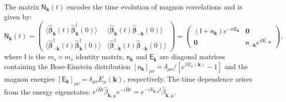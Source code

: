 The matrix $\mathsf{N}_{\mathbf{k}}(t)$ encodes the time evolution of magnon correlations and is given by:
\begin{equation}
    \mathsf{N}_{\mathbf{k}}(t) 
    = 
    \begin{pmatrix}
        \langle \hat{\boldsymbol{\beta}}_{\mathbf{k}}(t) \hat{\boldsymbol{\beta}}_{\mathbf{k}}^{\dagger}(0) \rangle & \langle \hat{\boldsymbol{\beta}}_{\mathbf{k}}(t) \hat{\boldsymbol{\beta}}_{-\mathbf{k}}(0) \rangle \\
        \langle \hat{\boldsymbol{\beta}}_{-\mathbf{k}}^{\dagger}(t) \hat{\boldsymbol{\beta}}_{\mathbf{k}}^{\dagger}(0) \rangle & \langle \hat{\boldsymbol{\beta}}_{-\mathbf{k}}^{\dagger}(t) \hat{\boldsymbol{\beta}}_{-\mathbf{k}}(0) \rangle
    \end{pmatrix}
    = 
    \begin{pmatrix}
        (\mathsf{I} + \mathsf{n}_{\mathbf{k}})e^{-it\mathsf{E}_{\mathbf{k}}} & \mathbf{0} \\
        \mathbf{0} & \mathsf{n}_{-\mathbf{k}}e^{it\mathsf{E}_{-\mathbf{k}}}
    \end{pmatrix},
\end{equation}
where $\mathsf{I}$ is the $m_s \times m_s$ identity matrix, $\mathsf{n}_{\mathbf{k}}$ and $\mathsf{E}_{\mathbf{k}}$ are diagonal matrices containing the Bose-Einstein distribution $[\mathsf{n}_{\mathbf{k}}]_{\mu\nu} = \delta_{\mu\nu}/[e^{\beta E_\mu(\mathbf{k})} - 1]$ and the magnon energies $[\mathsf{E}_{\mathbf{k}}]_{\mu\nu} = \delta_{\mu\nu}E_{\mu}(\mathbf{k})$, respectively. The time dependence arises from the energy eigenstates: $e^{i\hat{H}t}\hat{\beta}_{\mathbf{k},\mu}e^{-i\hat{H}t} = e^{-iE_{\mathbf{k},\mu}t}\hat{\beta}_{\mathbf{k},\mu}$.



